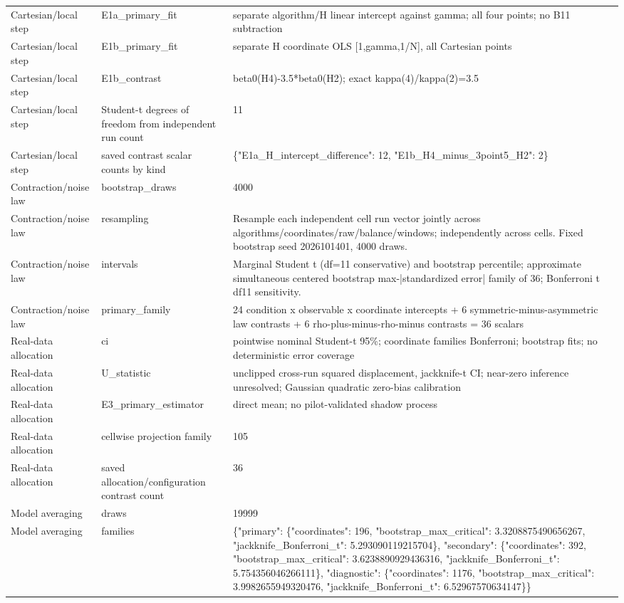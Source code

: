 \begin{tabular}{lll}
Cartesian/local step & E1a\_primary\_fit & separate algorithm/H linear intercept against gamma; all four points; no B11 subtraction \\
Cartesian/local step & E1b\_primary\_fit & separate H coordinate OLS [1,gamma,1/N], all Cartesian points \\
Cartesian/local step & E1b\_contrast & beta0(H4)-3.5*beta0(H2); exact kappa(4)/kappa(2)=3.5 \\
Cartesian/local step & Student-t degrees of freedom from independent run count & 11 \\
Cartesian/local step & saved contrast scalar counts by kind & \{"E1a\_H\_intercept\_difference": 12, "E1b\_H4\_minus\_3point5\_H2": 2\} \\
Contraction/noise law & bootstrap\_draws & 4000 \\
Contraction/noise law & resampling & Resample each independent cell run vector jointly across algorithms/coordinates/raw/balance/windows; independently across cells. Fixed bootstrap seed 2026101401, 4000 draws. \\
Contraction/noise law & intervals & Marginal Student t (df=11 conservative) and bootstrap percentile; approximate simultaneous centered bootstrap max-|standardized error| family of 36; Bonferroni t df11 sensitivity. \\
Contraction/noise law & primary\_family & 24 condition x observable x coordinate intercepts + 6 symmetric-minus-asymmetric law contrasts + 6 rho-plus-minus-rho-minus contrasts = 36 scalars \\
Real-data allocation & ci & pointwise nominal Student-t 95\%; coordinate families Bonferroni; bootstrap fits; no deterministic error coverage \\
Real-data allocation & U\_statistic & unclipped cross-run squared displacement, jackknife-t CI; near-zero inference unresolved; Gaussian quadratic zero-bias calibration \\
Real-data allocation & E3\_primary\_estimator & direct mean; no pilot-validated shadow process \\
Real-data allocation & cellwise projection family & 105 \\
Real-data allocation & saved allocation/configuration contrast count & 36 \\
Model averaging & draws & 19999 \\
Model averaging & families & \{"primary": \{"coordinates": 196, "bootstrap\_max\_critical": 3.3208875490656267, "jackknife\_Bonferroni\_t": 5.293090119215704\}, "secondary": \{"coordinates": 392, "bootstrap\_max\_critical": 3.6238890929436316, "jackknife\_Bonferroni\_t": 5.754356046266111\}, "diagnostic": \{"coordinates": 1176, "bootstrap\_max\_critical": 3.9982655949320476, "jackknife\_Bonferroni\_t": 6.52967570634147\}\} \\

\end{tabular}
